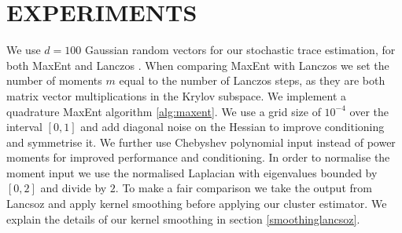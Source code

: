 \documentclass[letterpaper]{article} %
\begin{document}
\section{EXPERIMENTS}
\label{experiments}
We use $d=100$ Gaussian random vectors for our stochastic trace estimation, for both MaxEnt and Lanczos \citep{ubaru2017fast}. 
When comparing MaxEnt with Lanczos we set the number of moments $m$ equal to the number of Lanczos steps, as they are both matrix vector multiplications in the Krylov subspace. We implement a quadrature MaxEnt algorithm \ref{alg:maxent}. We use a grid size of $10^{-4}$ over the interval $[0,1]$ and add diagonal noise on the Hessian to improve conditioning and symmetrise it. We further use Chebyshev polynomial input instead of power moments for improved performance and conditioning. In order to normalise the moment input we use the normalised Laplacian with eigenvalues bounded by $[0,2]$ and divide by $2$. 
To make a fair comparison we take the output from Lancsoz \citep{ubaru2017fast} and apply kernel smoothing \citep{lin2016approximating} before applying our cluster estimator. We explain the details of our kernel smoothing in section \ref{smoothinglancsoz}.

	
\end{document}
